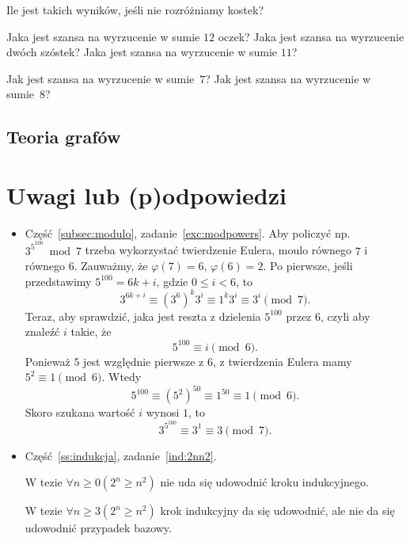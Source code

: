 \documentclass[12pt]{article}
\begin{document}
\begin{enumerate}
    Ile jest takich wyników, jeśli nie rozróżniamy kostek?
    
    Jaka jest szansa na wyrzucenie w sumie $12$ oczek? Jaka jest 
    szansa na wyrzucenie dwóch szóstek?
    Jaka jest szansa na wyrzucenie w sumie $11$?
    
    Jak jest szansa na wyrzucenie w sumie~$7$?
    Jak jest szansa na wyrzucenie w sumie~$8$?
\end{enumerate}


\subsection{Teoria grafów}

\section{Uwagi lub (p)odpowiedzi}


\begin{itemize}
	\item Część~\ref{subsec:modulo}, zadanie~\ref{exc:modpowers}.
	Aby policzyć np. $3^{5^100} \bmod 7$ trzeba wykorzystać 
	twierdzenie Eulera, moulo równego $7$ i równego $6$.
	Zauważmy, że $\varphi(7)=6$, $\varphi(6)=2$.
	Po pierwsze, jeśli przedstawimy $5^{100} = 6k+i$, gdzie $0\leq i<6$, to 
	\[
	3^{6k+i} \equiv (3^6)^k3^i \equiv 1^k3^i \equiv 3^i \pmod 7.
	\]
	Teraz, aby sprawdzić, jaka jest reszta z dzielenia $5^100$ przez $6$, czyli aby znaleźć $i$ takie, że 
	\[
	5^{100}\equiv i \pmod 6.
	\]
	Ponieważ $5$ jest względnie pierwsze z $6$, z twierdzenia Eulera mamy $5^2 \equiv 1 \pmod 6$.
	Wtedy 
	\[
	5^100 \equiv (5^2)^{50} \equiv 1^{50} \equiv 1 \pmod 6.
	\]
	Skoro szukana wartość $i$ wynosi $1$, to 
	\[
	3^{5^100} \equiv 3^1 \equiv 3 \pmod 7.
	\]
    \item Część~\ref{ss:indukcja}, zadanie~\ref{ind:2nn2}. 
     
     W tezie $\forall n\geq 0 (2^n\geq n^2)$ nie uda się 
     udowodnić kroku indukcyjnego.
     
     W tezie $\forall n\geq 3 (2^n\geq n^2)$ krok indukcyjny da się udowodnić, ale nie da się udowodnić przypadek bazowy.
\end{itemize}



\end{document}
